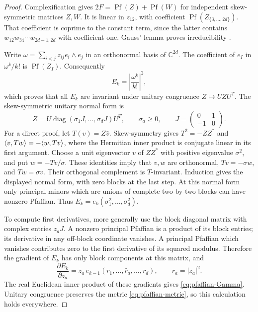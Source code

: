 \begin{proof}
Complexification gives
\(2F=\operatorname{Pf}(Z)+\operatorname{Pf}(W)\) for independent
skew-symmetric matrices \(Z,W\). It is linear in \(z_{12}\), with
coefficient \(\operatorname{Pf}(Z_{\{3,\ldots,2d\}})\).
That coefficient is coprime to the constant term, since the latter
contains \(w_{12}w_{34}\cdots w_{2d-1,2d}\) with coefficient one.
Gauss' lemma proves irreducibility
\cite[Chapter~VIII, Section~5, pp.~395--398]{Knapp16}.

Write \(\omega=\sum_{i<j}z_{ij}e_i\wedge e_j\) in an orthonormal
basis of \(\mathbb C^{2d}\).  The coefficient of \(e_I\) in
\(\omega^k/k!\) is \(\operatorname{Pf}(Z_I)\).  Consequently
\begin{equation}\label{eq:pfaffian-exterior-norm}
 E_k=\left|\frac{\omega^k}{k!}\right|^2,
\end{equation}
which proves that all \(E_k\) are invariant under unitary congruence
\(Z\mapsto UZU^T\).
The skew-symmetric unitary normal form is
\[
 Z=U\operatorname{diag}(\sigma_1J,\ldots,\sigma_dJ)U^T,
 \qquad \sigma_a\ge0,\qquad
 J=\begin{pmatrix}0&1\\-1&0\end{pmatrix}.
\]
For a direct proof, let \(T(v)=Z\bar v\).  Skew-symmetry gives
\(T^2=-ZZ^*\) and
\(\langle v,Tw\rangle=-\langle w,Tv\rangle\), where the Hermitian inner product is
conjugate linear in its first argument.  Choose a unit eigenvector
\(v\) of \(ZZ^*\) with positive eigenvalue \(\sigma^2\), and put
\(w=-Tv/\sigma\).  These identities imply that \(v,w\) are
orthonormal, \(Tv=-\sigma w\), and \(Tw=\sigma v\).
Their orthogonal complement is \(T\)-invariant.  Induction gives
the displayed normal form, with zero blocks at the last step.
At this normal form only
principal minors which are unions of complete two-by-two blocks
can have nonzero Pfaffian.  Thus \(E_k=e_k(\sigma_1^2,\ldots,
\sigma_d^2)\).

To compute first derivatives, more generally use the block diagonal
matrix with complex entries \(z_aJ\).  A nonzero principal Pfaffian
is a product of its block entries; its derivative in any off-block
coordinate vanishes.  A principal Pfaffian which vanishes contributes
zero to the first derivative of its squared modulus.  Therefore the
gradient of \(E_k\) has only block components at this matrix, and
\[
 \frac{\partial E_k}{\partial z_a}
   =\bar z_a\,e_{k-1}(r_1,\ldots,\widehat r_a,\ldots,r_d),
 \qquad r_a=|z_a|^2.
\]
The real Euclidean inner product of these gradients gives
\eqref{eq:pfaffian-Gamma}.  Unitary congruence preserves the metric
\eqref{eq:pfaffian-metric}, so this calculation holds everywhere.


\end{proof}
